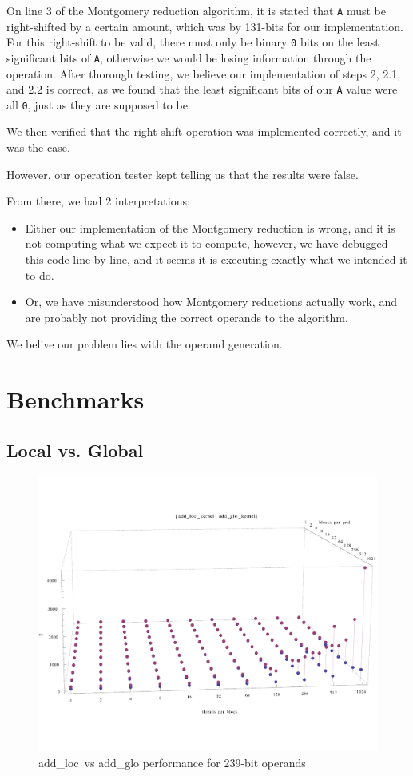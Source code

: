 \documentclass[12pt, a4paper]{report}
\begin{document}
On line 3 of the Montgomery reduction algorithm, it is stated that \verb+A+ must be
right-shifted by a certain amount, which was by 131-bits for our implementation.
For this right-shift to be valid, there must only be binary \verb+0+ bits on the least
significant bits of \verb+A+, otherwise we would be losing information through
the operation.
After thorough testing, we believe our implementation of steps
2, 2.1, and 2.2 is correct, as we found that the least significant bits of our
\verb+A+ value were all \verb+0+, just as they are supposed to be.

We then verified that the right shift operation was implemented correctly, and it was the case.

However, our operation tester kept telling us that the results were false.

From there, we had 2 interpretations:
\begin{itemize}
\item Either our implementation of the Montgomery reduction is wrong, and it is not computing
what we expect it to compute, however, we have debugged this code line-by-line,
and it seems it is executing exactly what we intended it to do.

\item Or, we have misunderstood how Montgomery reductions
actually work, and are probably not providing the correct operands to the algorithm.
\end{itemize}

We belive our problem lies with the operand generation.

\section{Benchmarks}
\subsection*{Local vs. Global}

\begin{figure}[h]
\centering
\includegraphics[scale=0.3]{figs/add_loc_vs_add_glo_kepler_131_duration}
\caption{add\_loc\ vs add\_glo performance for 239-bit operands}
\label{fig:shift_addition_karatsuba_final}
\end{figure}
\end{document}
